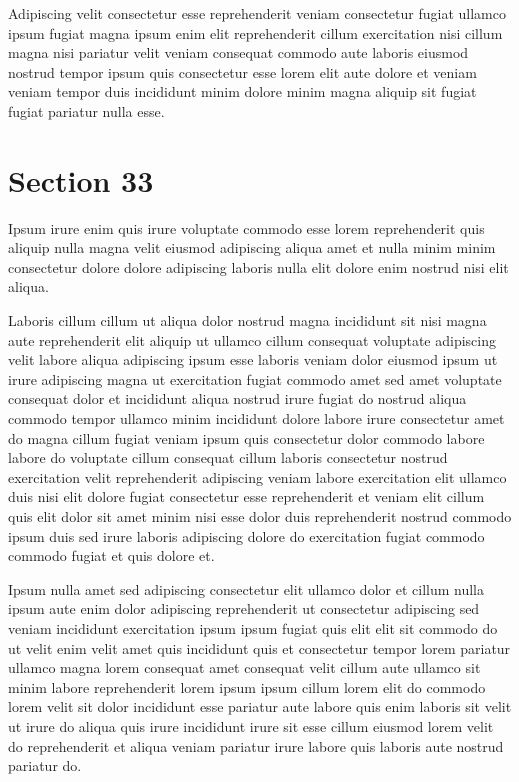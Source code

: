 \documentclass{article}
\begin{document}
Adipiscing velit consectetur esse reprehenderit veniam consectetur fugiat ullamco ipsum fugiat magna ipsum enim elit reprehenderit cillum exercitation nisi cillum magna nisi pariatur velit veniam consequat commodo aute laboris eiusmod nostrud tempor ipsum quis consectetur esse lorem elit aute dolore et veniam veniam tempor duis incididunt minim dolore minim magna aliquip sit fugiat fugiat pariatur nulla esse.

\section{Section 33}
Ipsum irure enim quis irure voluptate commodo esse lorem reprehenderit quis aliquip nulla magna velit eiusmod adipiscing aliqua amet et nulla minim minim consectetur dolore dolore adipiscing laboris nulla elit dolore enim nostrud nisi elit aliqua.

Laboris cillum cillum ut aliqua dolor nostrud magna incididunt sit nisi magna aute reprehenderit elit aliquip ut ullamco cillum consequat voluptate adipiscing velit labore aliqua adipiscing ipsum esse laboris veniam dolor eiusmod ipsum ut irure adipiscing magna ut exercitation fugiat commodo amet sed amet voluptate consequat dolor et incididunt aliqua nostrud irure fugiat do nostrud aliqua commodo tempor ullamco minim incididunt dolore labore irure consectetur amet do magna cillum fugiat veniam ipsum quis consectetur dolor commodo labore labore do voluptate cillum consequat cillum laboris consectetur nostrud exercitation velit reprehenderit adipiscing veniam labore exercitation elit ullamco duis nisi elit dolore fugiat consectetur esse reprehenderit et veniam elit cillum quis elit dolor sit amet minim nisi esse dolor duis reprehenderit nostrud commodo ipsum duis sed irure laboris adipiscing dolore do exercitation fugiat commodo commodo fugiat et quis dolore et.

Ipsum nulla amet sed adipiscing consectetur elit ullamco dolor et cillum nulla ipsum aute enim dolor adipiscing reprehenderit ut consectetur adipiscing sed veniam incididunt exercitation ipsum ipsum fugiat quis elit elit sit commodo do ut velit enim velit amet quis incididunt quis et consectetur tempor lorem pariatur ullamco magna lorem consequat amet consequat velit cillum aute ullamco sit minim labore reprehenderit lorem ipsum ipsum cillum lorem elit do commodo lorem velit sit dolor incididunt esse pariatur aute labore quis enim laboris sit velit ut irure do aliqua quis irure incididunt irure sit esse cillum eiusmod lorem velit do reprehenderit et aliqua veniam pariatur irure labore quis laboris aute nostrud pariatur do.
\end{document}
